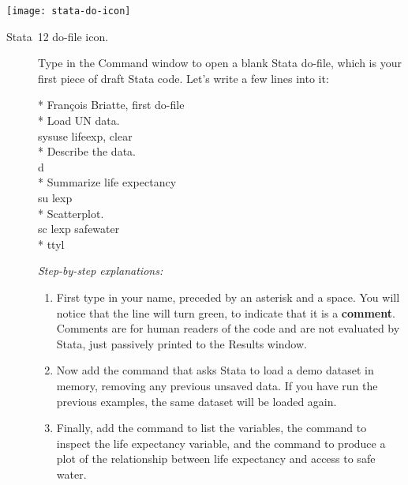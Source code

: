 		\begin{marginfigure}
			\texttt{[image: stata-do-icon]}
			\caption{Stata~12 do-file icon.}
			\label{fig:stata-do}
		\end{marginfigure}

	\begin{description}
	\item[] Type  in the Command window to open a blank Stata do-file, which is your first piece of draft Stata code. Let's write a few lines into it:%

		\begin{docspec}
		  * François Briatte, first do-file\\[1em]%
		  * Load UN data.\\%
			sysuse lifeexp, clear\\[1em]%
			* Describe the data.\\%
			d\\[1em]%
			* Summarize life expectancy\\%
			su lexp\\[1em]%
			* Scatterplot.\\%
		  sc lexp safewater\\[1em]%
			* ttyl\\
		\end{docspec}

		\emph{Step-by-step explanations:}
		
		\begin{enumerate}
			\item First type in your name, preceded by an asterisk and a space. You will notice that the line will turn green, to indicate that it is a \textbf{comment}. Comments are for human readers of the code and are not evaluated by Stata, just passively printed to the Results window.%
			
			\item Now add the  command that asks Stata to load a demo dataset in memory, removing any previous unsaved data. If you have run the previous examples, the same dataset will be loaded again.%
			
			\item Finally, add the  command to list the variables, the  command to inspect the life expectancy variable, and the  command to produce a plot of the relationship between life expectancy and access to safe water.%


\end{enumerate}
\end{description}
